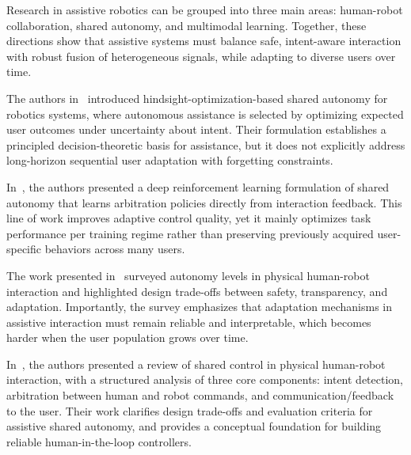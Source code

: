 \documentclass[3p,times,procedia]{elsarticle}
\begin{document}

Research in assistive robotics can be grouped into three main areas: human-robot collaboration, shared autonomy, and multimodal learning. Together, these directions show that assistive systems must balance safe, intent-aware interaction with robust fusion of heterogeneous signals, while adapting to diverse users over time. 

The authors in~\cite{javdani2018shared} introduced hindsight-optimization-based shared autonomy for robotics systems, where autonomous assistance is selected by optimizing expected user outcomes under uncertainty about intent. Their formulation establishes a principled decision-theoretic basis for assistance, but it does not explicitly address long-horizon sequential user adaptation with forgetting constraints.

In~\cite{reddy2018shared}, the authors presented a deep reinforcement learning formulation of shared autonomy that learns arbitration policies directly from interaction feedback. This line of work improves adaptive control quality, yet it mainly optimizes task performance per training regime rather than preserving previously acquired user-specific behaviors across many users.

The work presented in~\cite{selvaggio2021autonomy} surveyed autonomy levels in physical human-robot interaction and highlighted design trade-offs between safety, transparency, and adaptation. Importantly, the survey emphasizes that adaptation mechanisms in assistive interaction must remain reliable and interpretable, which becomes harder when the user population grows over time.

In~\cite{losey2018assistive}, the authors presented a review of shared control in physical human-robot interaction, with a structured analysis of three core components: intent detection, arbitration between human and robot commands, and communication/feedback to the user. Their work clarifies design trade-offs and evaluation criteria for assistive shared autonomy, and provides a conceptual foundation for building reliable human-in-the-loop controllers. %
\end{document}
